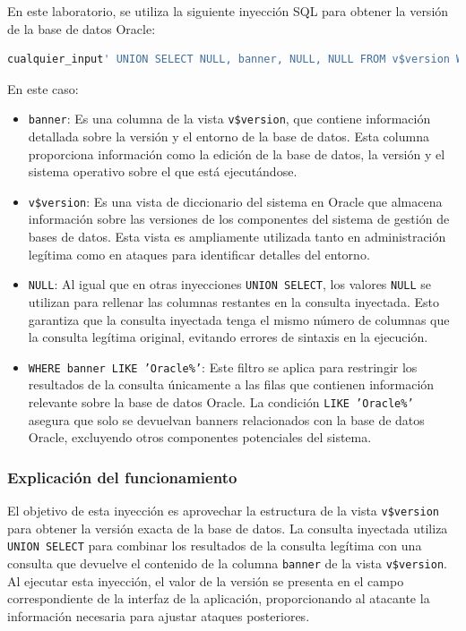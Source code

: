 \documentclass[a4paper,12pt]{article}
\begin{document}
En este laboratorio, se utiliza la siguiente inyección SQL para obtener la versión de la base de datos Oracle:

\begin{lstlisting}[language=SQL]
cualquier_input' UNION SELECT NULL, banner, NULL, NULL FROM v$version WHERE banner LIKE 'Oracle%' --
\end{lstlisting}

En este caso:
\begin{itemize}
    \item \texttt{banner}: Es una columna de la vista \texttt{v\$version}, que contiene información detallada sobre la versión y el entorno de la base de datos. Esta columna proporciona información como la edición de la base de datos, la versión y el sistema operativo sobre el que está ejecutándose.
    \item \texttt{v\$version}: Es una vista de diccionario del sistema en Oracle que almacena información sobre las versiones de los componentes del sistema de gestión de bases de datos. Esta vista es ampliamente utilizada tanto en administración legítima como en ataques para identificar detalles del entorno.
    \item \texttt{NULL}: Al igual que en otras inyecciones \texttt{UNION SELECT}, los valores \texttt{NULL} se utilizan para rellenar las columnas restantes en la consulta inyectada. Esto garantiza que la consulta inyectada tenga el mismo número de columnas que la consulta legítima original, evitando errores de sintaxis en la ejecución.
    \item \texttt{WHERE banner LIKE 'Oracle\%'}: Este filtro se aplica para restringir los resultados de la consulta únicamente a las filas que contienen información relevante sobre la base de datos Oracle. La condición \texttt{LIKE 'Oracle\%'} asegura que solo se devuelvan banners relacionados con la base de datos Oracle, excluyendo otros componentes potenciales del sistema.
\end{itemize}

\subsubsection{Explicación del funcionamiento}
El objetivo de esta inyección es aprovechar la estructura de la vista \texttt{v\$version} para obtener la versión exacta de la base de datos. La consulta inyectada utiliza \texttt{UNION SELECT} para combinar los resultados de la consulta legítima con una consulta que devuelve el contenido de la columna \texttt{banner} de la vista \texttt{v\$version}. Al ejecutar esta inyección, el valor de la versión se presenta en el campo correspondiente de la interfaz de la aplicación, proporcionando al atacante la información necesaria para ajustar ataques posteriores.
\end{document}
